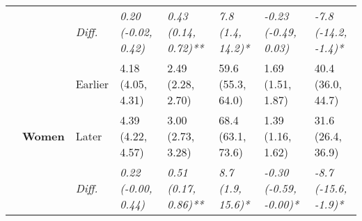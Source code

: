 \documentclass[12pt, a4paper]{article}
\begin{document}
\begin{appendices}
\begin{table}[!p]
{\begin{tabular}[t]{>{}l>{}lllllll}
        \cmidrule{3-8}
                                              &                                 & \cellcolor{gray!10}\em{Diff.} & \cellcolor{gray!10}\em{0.20 (-0.02, 0.42)}  & \cellcolor{gray!10}\em{0.43 (0.14, 0.72)**}  & \cellcolor{gray!10}\em{7.8 (1.4, 14.2)*}    & \cellcolor{gray!10}\em{-0.23 (-0.49, 0.03)}     & \cellcolor{gray!10}\em{-7.8 (-14.2, -1.4)*}    \\
        \cmidrule{2-8}
                                              & \multirow{3}{*}{\textbf{Women}} & Earlier                       & 4.18 (4.05, 4.31)                           & 2.49 (2.28, 2.70)                            & 59.6 (55.3, 64.0)                           & 1.69 (1.51, 1.87)                               & 40.4 (36.0, 44.7)                              \\
        \cmidrule{3-8}
                                              &                                 & Later                         & 4.39 (4.22, 4.57)                           & 3.00 (2.73, 3.28)                            & 68.4 (63.1, 73.6)                           & 1.39 (1.16, 1.62)                               & 31.6 (26.4, 36.9)                              \\
        \cmidrule{3-8}
                                              &                                 & \cellcolor{gray!10}\em{Diff.} & \cellcolor{gray!10}\em{0.22 (-0.00, 0.44)}  & \cellcolor{gray!10}\em{0.51 (0.17, 0.86)**}  & \cellcolor{gray!10}\em{8.7 (1.9, 15.6)*}    & \cellcolor{gray!10}\em{-0.30 (-0.59, -0.00)*}   & \cellcolor{gray!10}\em{-8.7 (-15.6, -1.9)*}    \\
        \bottomrule
      \end{tabular}}
  \end{table}
  \vspace*{\fill}


\end{appendices}
\end{document}
